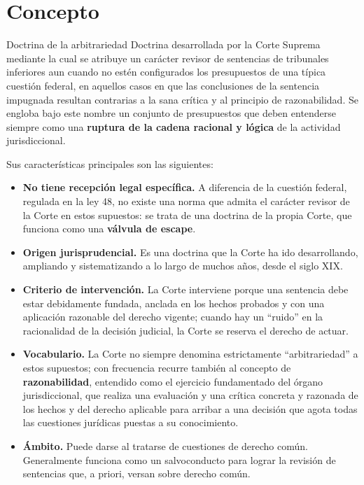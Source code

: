 \documentclass[12pt,oneside]{book}
\begin{document}
\section{Concepto}

\begin{definition}{Doctrina de la arbitrariedad}
Doctrina desarrollada por la Corte Suprema mediante la cual se atribuye un carácter revisor de sentencias de tribunales inferiores aun cuando no estén configurados los presupuestos de una típica cuestión federal, en aquellos casos en que las conclusiones de la sentencia impugnada resultan contrarias a la sana crítica y al principio de razonabilidad. Se engloba bajo este nombre un conjunto de presupuestos que deben entenderse siempre como una \textbf{ruptura de la cadena racional y lógica} de la actividad jurisdiccional.
\end{definition}

Sus características principales son las siguientes:

\begin{itemize}
    \item \textbf{No tiene recepción legal específica.} A diferencia de la cuestión federal, regulada en la ley 48, no existe una norma que admita el carácter revisor de la Corte en estos supuestos: se trata de una doctrina de la propia Corte, que funciona como una \textbf{válvula de escape}.
    \item \textbf{Origen jurisprudencial.} Es una doctrina que la Corte ha ido desarrollando, ampliando y sistematizando a lo largo de muchos años, desde el siglo XIX.
    \item \textbf{Criterio de intervención.} La Corte interviene porque una sentencia debe estar debidamente fundada, anclada en los hechos probados y con una aplicación razonable del derecho vigente; cuando hay un ``ruido'' en la racionalidad de la decisión judicial, la Corte se reserva el derecho de actuar.
    \item \textbf{Vocabulario.} La Corte no siempre denomina estrictamente ``arbitrariedad'' a estos supuestos; con frecuencia recurre también al concepto de \textbf{razonabilidad}, entendido como el ejercicio fundamentado del órgano jurisdiccional, que realiza una evaluación y una crítica concreta y razonada de los hechos y del derecho aplicable para arribar a una decisión que agota todas las cuestiones jurídicas puestas a su conocimiento.
    \item \textbf{Ámbito.} Puede darse al tratarse de cuestiones de derecho común. Generalmente funciona como un salvoconducto para lograr la revisión de sentencias que, a priori, versan sobre derecho común.
\end{itemize}
\end{document}
